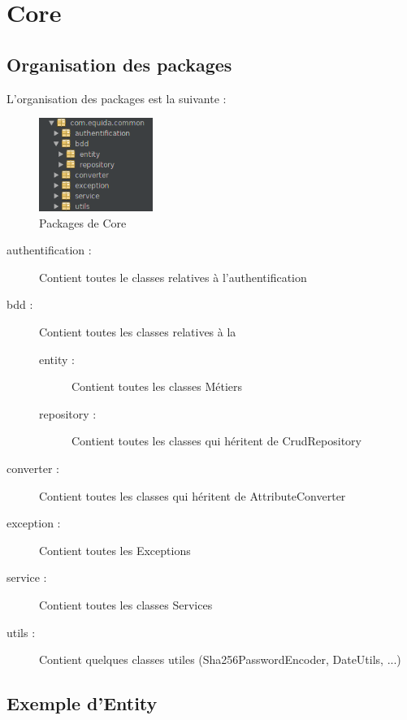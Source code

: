 \chapter{Core}
	\section{Organisation des packages}

		L'organisation des packages est la suivante :

		\begin{figure}[H]
			\centering\includegraphics[width=0.33\textwidth, keepaspectratio]{res/package.png}
			\caption{Packages de Core}
		\end{figure}

		\begin{description}
			\item[authentification :]{Contient toutes le classes relatives à l'authentification}
			\item[bdd :]{Contient toutes les classes relatives à la \bdd{}}

			\begin{description}
				\item[entity :]{Contient toutes les classes Métiers}
				\item[repository :]{Contient toutes les classes qui héritent de CrudRepository}
			\end{description}

			\item[converter :]{Contient toutes les classes qui héritent de AttributeConverter}
			\item[exception :]{Contient toutes les Exceptions}
			\item[service :]{Contient toutes les classes Services}
			\item[utils :]{Contient quelques classes utiles (Sha256PasswordEncoder, DateUtils, ...)}
		\end{description}

	\section{Exemple d'Entity}

